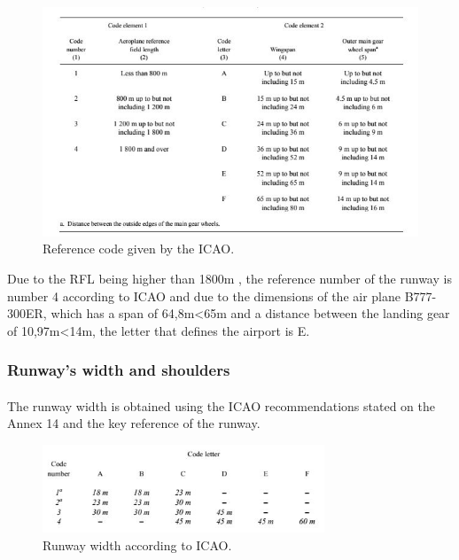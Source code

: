 			\begin{figure}[H]
				\centering
				\includegraphics[clip, trim=0cm 0cm 0cm 0cm, width=1\textwidth]{./images/Annex14/Referencecode}
				\caption{Reference code given by the ICAO.} %
				\label{} %
			\end{figure}
		
			Due to the RFL being higher than 1800m , the reference number of the runway is number 4 according to ICAO and due to the dimensions of the air plane B777-300ER, which has a span of 64,8m<65m and a distance between the landing gear of 10,97m<14m, the letter that defines the airport is E.
			
			\subsubsection{Runway's width and shoulders}
			\paragraph{}The runway width is obtained using the ICAO recommendations stated on the Annex 14 and the key reference of the runway. 
			
			\begin{figure}[H]
				\centering
				\includegraphics[clip, trim=0cm 0cm 0cm 0cm, width=0.75\textwidth]{./images/Annex14/RunwayWidth}
				\caption{Runway width according to ICAO.} %
				\label{} %
			\end{figure}
		
